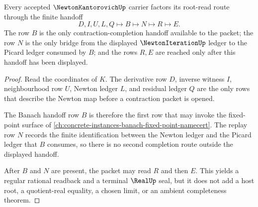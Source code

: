 \begin{theorem}
\label{thm:newton-kantorovich-banach-handoff}
Every accepted $\NewtonKantorovichUp$ carrier factors its root-read route through the finite handoff
$$
D,I,U,L,Q \longmapsto B \longmapsto N \longmapsto R \longmapsto E.
$$
The row $B$ is the only contraction-completion handoff available to the packet; the row $N$ is the only bridge from the displayed $\NewtonIterationUp$ ledger to the Picard ledger consumed by $B$; and the rows $R,E$ are reached only after this handoff has been displayed.
\end{theorem}
\begin{proof}
Read the coordinates of $K$. The derivative row $D$, inverse witness $I$, neighbourhood row $U$, Newton ledger $L$, and residual ledger $Q$ are the only rows that describe the Newton map before a contraction packet is opened.

The Banach handoff row $B$ is therefore the first row that may invoke the fixed-point surface of \autoref{ch:concrete-instances-banach-fixed-point-namecert}. The replay row $N$ records the finite identification between the Newton ledger and the Picard ledger that $B$ consumes, so there is no second completion route outside the displayed handoff.

After $B$ and $N$ are present, the packet may read $R$ and then $E$. This yields a regular rational readback and a terminal $\RealUp$ seal, but it does not add a host root, a quotient-real equality, a chosen limit, or an ambient completeness theorem.
\end{proof}


